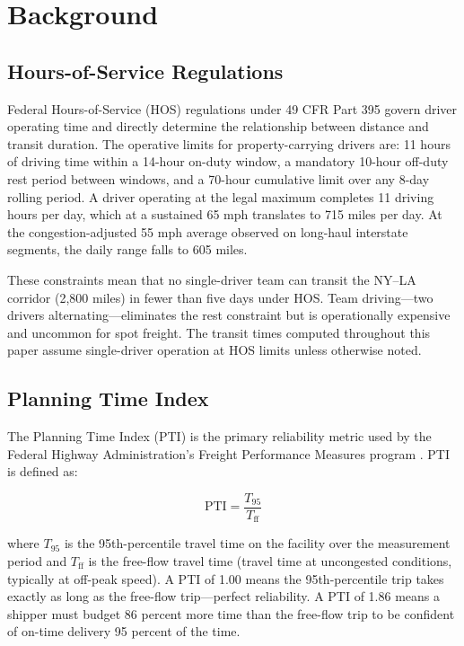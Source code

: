 \section{Background}
\label{sec:background}

\subsection{Hours-of-Service Regulations}

Federal Hours-of-Service (HOS) regulations under 49 CFR Part 395 \citep{CFR_HOS} govern driver operating time and directly determine the relationship between distance and transit duration. The operative limits for property-carrying drivers are: 11 hours of driving time within a 14-hour on-duty window, a mandatory 10-hour off-duty rest period between windows, and a 70-hour cumulative limit over any 8-day rolling period. A driver operating at the legal maximum completes 11 driving hours per day, which at a sustained 65 mph translates to 715 miles per day. At the congestion-adjusted 55 mph average observed on long-haul interstate segments, the daily range falls to 605 miles.

These constraints mean that no single-driver team can transit the NY--LA corridor (2,800 miles) in fewer than five days under HOS. Team driving---two drivers alternating---eliminates the rest constraint but is operationally expensive and uncommon for spot freight. The transit times computed throughout this paper assume single-driver operation at HOS limits unless otherwise noted.

\subsection{Planning Time Index}

The Planning Time Index (PTI) is the primary reliability metric used by the Federal Highway Administration's Freight Performance Measures program \citep{FHWA_freight2023}. PTI is defined as:

\begin{equation}
  \text{PTI} = \frac{T_{95}}{T_{\text{ff}}}
  \label{eq:pti}
\end{equation}

where $T_{95}$ is the 95th-percentile travel time on the facility over the measurement period and $T_{\text{ff}}$ is the free-flow travel time (travel time at uncongested conditions, typically at off-peak speed). A PTI of 1.00 means the 95th-percentile trip takes exactly as long as the free-flow trip---perfect reliability. A PTI of 1.86 means a shipper must budget 86 percent more time than the free-flow trip to be confident of on-time delivery 95 percent of the time.

